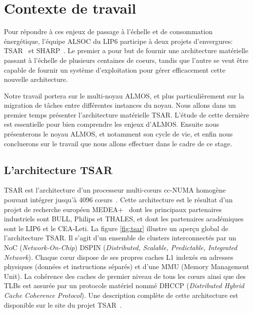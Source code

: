 \chapter{Contexte de travail}
\label{sec:context}

  Pour répondre à ces enjeux de passage à l'échelle et de consommation
  énergétique, l'équipe ALSOC du LIP6 participe à deux projets d'envergures:
  TSAR~\cite{tsar2008} et SHARP~\cite{sharp2012}. Le premier a pour but de
  fournir une architecture matérielle passant à l'échelle de plusieurs centaines
  de coeurs, tandis que l'autre se veut être capable de fournir un système
  d'exploitation pour gérer efficacement cette nouvelle architecture.

  Notre travail portera sur le multi-noyau ALMOS, et plus particulièrement sur
  la migration de tâches entre différentes instances du noyau. Nous allons dans
  un premier temps présenter l'architecture matérielle TSAR. L'étude de cette
  dernière est essentielle pour bien comprendre les enjeux d'ALMOS. Ensuite nous
  présenterons le noyau ALMOS, et notamment son cycle de vie, et enfin nous
  concluerons sur le travail que nous allons effectuer dans le cadre de ce
  stage.
  

  \section{L'architecture TSAR}
  \label{sec:tsar}

    TSAR est l'architecture d’un processeur multi-c\oe urs cc-NUMA homogène
    pouvant intégrer jusqu’à 4096 c\oe urs~\cite{greiner2009tsar}. Cette
    architecture est le résultat d’un projet de recherche européen
    MEDEA+~\cite{tsar2008} dont les principaux partenaires industriels sont
    BULL, Philips et THALES, et dont les partenaires académiques sont le LIP6 et
    le CEA-Leti. La figure \ref{fig:tsar} illustre un aperçu global de
    l'architecture TSAR. Il s'agit d'un ensemble de clusters interconnectés par
    un NoC (\textit{Network-On-Chip}) DSPIN (\textit{Distributed, Scalable,
      Predictable, Integrated Network}). Chaque c\oe ur dispose de ses propres
    caches L1 indexés en adresses physiques (données et instructions séparés) et
    d'une MMU (Memory Management Unit). La cohérence des caches de premier
    niveau de tous les c\oe urs ainsi que des TLBs est assurée par un protocole
    matériel nommé DHCCP (\textit{Distributed Hybrid Cache Coherence
      Protocol}). Une description complète de cette architecture est disponible
    sur le site du projet TSAR~\cite{tsar2008web}.


